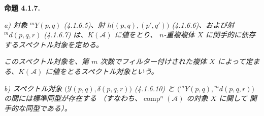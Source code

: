 \medskip\noindent\textbf{命題 4.1.7.}\quad

\noindent\textit{a) 対象 ${}^{m}\!Y(p,q)$ (4.1.6.5)、射
$h\bigl((p,q),(p',q')\bigr)$ (4.1.6.6)、および射
${}^{m}\!d(p,q,r)$ (4.1.6.7) は、$K(\mathcal A)$ に値をとり、
$n$-重複複体 $X$ に関手的に依存するスペクトル対象を定める。}

\noindent\textit{このスペクトル対象を、第 $m$ 次数でフィルター付けされた複体
$X$ によって定まる、$K(\mathcal A)$ に値をとるスペクトル対象という。}

\noindent\textit{b) スペクトル対象
$\bigl(\mathcal Y(p,q),\delta(p,q,r)\bigr)$ (4.1.6.10) と
$\bigl({}^{m}\!Y(p,q),{}^{m}\!d(p,q,r)\bigr)$ の間には標準同型が存在する
（すなわち、$\operatorname{comp}^n(\mathcal A)$ の対象 $X$ に関して
関手的な同型である）。}
\endgroup
